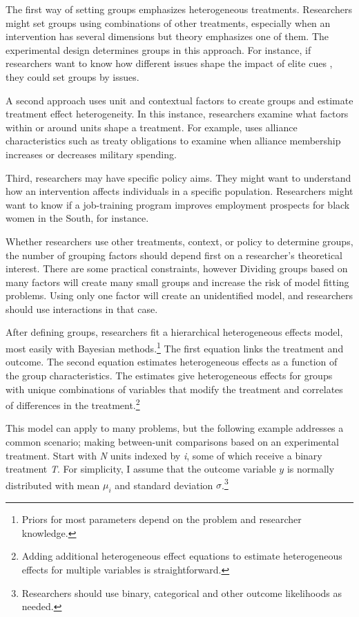 \documentclass[12pt]{article}
\begin{document}
The first way of setting groups emphasizes heterogeneous treatments.
Researchers might set groups using combinations of other treatments, especially when an intervention has several dimensions but theory emphasizes one of them. 
The experimental design determines groups in this approach.   
For instance, if researchers want to know how different issues shape the impact of elite cues \citep{GuisingerSaunders2017}, they could set groups by issues. 


A second approach uses unit and contextual factors to create groups and estimate treatment effect heterogeneity. 
In this instance, researchers examine what factors within or around units shape a treatment.
For example, \citet{Alley2021isq} uses alliance characteristics such as treaty obligations to examine when alliance membership increases or decreases military spending.


Third, researchers may have specific policy aims.
They might want to understand how an intervention affects individuals in a specific population.
Researchers might want to know if a job-training program improves employment prospects for black women in the South, for instance.  


Whether researchers use other treatments, context, or policy to determine groups, the number of grouping factors should depend first on a researcher's theoretical interest.
There are some practical constraints, however
Dividing groups based on many factors will create many small groups and increase the risk of model fitting problems. 
Using only one factor will create an unidentified model, and researchers should use interactions in that case. 


After defining groups, researchers fit a hierarchical heterogeneous effects model, most easily with Bayesian methods.\footnote{Priors for most parameters depend on the problem and researcher knowledge.} 
The first equation links the treatment and outcome. 
The second equation estimates heterogeneous effects as a function of the group characteristics. 
The estimates give heterogeneous effects for groups with unique combinations of variables that modify the treatment and correlates of differences in the treatment.\footnote{Adding additional heterogeneous effect equations to estimate heterogeneous effects for multiple variables is straightforward.}  


This model can apply to many problems, but the following example addresses a common scenario; making between-unit comparisons based on an experimental treatment.    
Start with \textit{N} units indexed by \textit{i}, some of which receive a binary treatment \textit{T}.
For simplicity, I assume that the outcome variable ${y}$ is normally distributed with mean $\mu_i$ and standard deviation $\sigma$.\footnote{Researchers should use binary, categorical and other outcome likelihoods as needed.}
\end{document}
